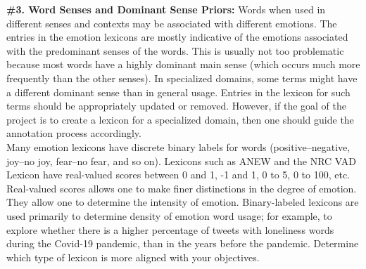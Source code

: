\documentclass[11pt]{article}
\begin{document}
\noindent \textbf{\#3. Word Senses and Dominant Sense Priors:} Words when used in different senses and contexts may be associated with different emotions. The entries in the emotion lexicons are mostly indicative of the emotions associated with the predominant senses of the words. This is usually not too problematic because most words have a highly dominant main sense (which occurs much more frequently than the other senses). 
In specialized domains, some terms might have a different dominant sense than in general usage. Entries in the lexicon for such terms should be appropriately updated or removed. However, if the goal of the project is to create a lexicon for a specialized domain, then one should guide the annotation process accordingly.\\[-8pt]


{} Many emotion lexicons have discrete binary labels for words (positive--negative, joy--no joy, fear--no fear, and so on). Lexicons such as ANEW and the NRC VAD Lexicon %
have real-valued scores between 0 and 1, -1 and 1, 0 to 5, 0 to 100, etc.
Real-valued scores allows one to make finer distinctions in the degree of emotion. They allow one to determine the intensity of emotion. Binary-labeled lexicons are used primarily to determine density of emotion word usage; for example,
to explore whether there is a higher percentage of tweets with loneliness words during the Covid-19 pandemic, than in the years before the pandemic. 
Determine 
which type of lexicon is more aligned with your objectives. \\[4pt] %


  
 
 
 
 
\end{document}
